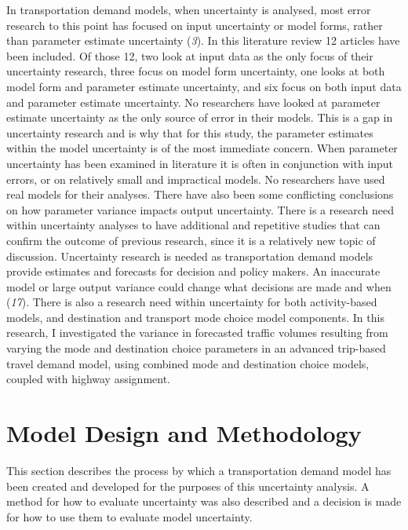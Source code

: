 \documentclass[
  letterpaper,
]{trb}
\begin{document}
In transportation demand models, when uncertainty is analysed, most
error research to this point has focused on input uncertainty or model
forms, rather than parameter estimate uncertainty (\emph{3}). In this
literature review 12 articles have been included. Of those 12, two look
at input data as the only focus of their uncertainty research, three
focus on model form uncertainty, one looks at both model form and
parameter estimate uncertainty, and six focus on both input data and
parameter estimate uncertainty. No researchers have looked at parameter
estimate uncertainty as the only source of error in their models. This
is a gap in uncertainty research and is why that for this study, the
parameter estimates within the model uncertainty is of the most
immediate concern. When parameter uncertainty has been examined in
literature it is often in conjunction with input errors, or on
relatively small and impractical models. No researchers have used real
models for their analyses. There have also been some conflicting
conclusions on how parameter variance impacts output uncertainty. There
is a research need within uncertainty analyses to have additional and
repetitive studies that can confirm the outcome of previous research,
since it is a relatively new topic of discussion. Uncertainty research
is needed as transportation demand models provide estimates and
forecasts for decision and policy makers. An inaccurate model or large
output variance could change what decisions are made and when
(\emph{17}). There is also a research need within uncertainty for both
activity-based models, and destination and transport mode choice model
components. In this research, I investigated the variance in forecasted
traffic volumes resulting from varying the mode and destination choice
parameters in an advanced trip-based travel demand model, using combined
mode and destination choice models, coupled with highway assignment.


\hypertarget{sec-methods}{%
\section{Model Design and Methodology}\label{sec-methods}}

This section describes the process by which a transportation demand
model has been created and developed for the purposes of this
uncertainty analysis. A method for how to evaluate uncertainty was also
described and a decision is made for how to use them to evaluate model
uncertainty.
\end{document}
